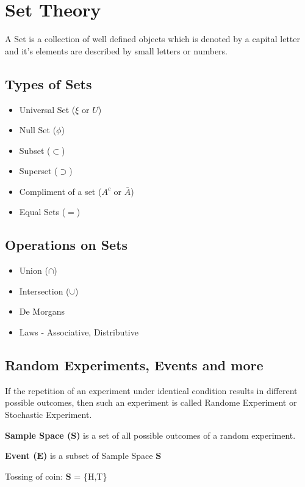 \documentclass[./EngineeringMaths.tex]{subfiles}
\begin{document}
\section[Set Theory]{Set Theory}
A Set is a collection of well defined objects which is denoted by a capital letter and it's elements are described by small letters or numbers.

\subsection*{Types of Sets}
\begin{itemize}
\item Universal Set ($\xi$ or $U$)
\item Null Set ($\phi$)
\item Subset ($\subset$)
\item Superset ($\supset$)
\item Compliment of a set ($A^c$ or $\bar{A}$)
\item Equal Sets ($=$)
\end{itemize}

\subsection*{Operations on Sets}
\begin{itemize}
\item Union ($\cap$)
\item Intersection ($\cup$)
\item De Morgans
\item Laws - Associative, Distributive
\end{itemize}

\subsection{Random Experiments, Events and more}
If the repetition of an experiment under identical condition results in different possible outcomes, then such an experiment is called Randome Experiment or Stochastic Experiment.

\textbf{Sample Space (\textbf{S})} is a set of all possible outcomes of a random experiment.\

\textbf{Event ($\mathbf{E}$)} is a subset of Sample Space \textbf{S}

 Tossing of coin: \textbf{S} = \{H,T\}
\end{document}
